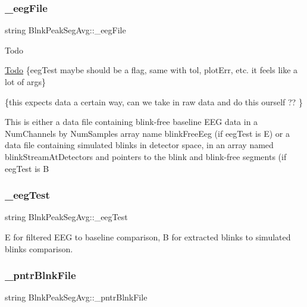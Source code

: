 \subsubsection{\texorpdfstring{\+\_\+eeg\+File}{\_eegFile}}
{\footnotesize\ttfamily string Blnk\+Peak\+Seg\+Avg\+::\+\_\+eeg\+File\hspace{0.3cm}{\ttfamily [private]}}

\begin{DoxyRefDesc}{Todo}
\item[\hyperlink{todo__todo000002}{Todo}]\{eeg\+Test maybe should be a flag, same with tol, plot\+Err, etc. it feels like a lot of args\} 

\{this expects data a certain way, can we take in raw data and do this ourself ?? \} \end{DoxyRefDesc}
This is either a data file containing blink-\/free baseline E\+EG data in a Num\+Channels by Num\+Samples array name blink\+Free\+Eeg (if eeg\+Test is \textquotesingle{}E\textquotesingle{}) or a data file containing simulated blinks in detector space, in an array named blink\+Stream\+At\+Detectors and pointers to the blink and blink-\/free segments (if eeg\+Test is \textquotesingle{}B\textquotesingle{} \mbox{\label{classBlnkPeakSegAvg_a6c00c8592e31ae1b455d280f4cc38f14}} 
\subsubsection{\texorpdfstring{\+\_\+eeg\+Test}{\_eegTest}}
{\footnotesize\ttfamily string Blnk\+Peak\+Seg\+Avg\+::\+\_\+eeg\+Test\hspace{0.3cm}{\ttfamily [private]}}

\textquotesingle{}E\textquotesingle{} for filtered E\+EG to baseline comparison, \textquotesingle{}B\textquotesingle{} for extracted blinks to simulated blinks comparison. \mbox{\label{classBlnkPeakSegAvg_a0dc6865b43997d95a59da56e3be254c8}} 
\subsubsection{\texorpdfstring{\+\_\+pntr\+Blnk\+File}{\_pntrBlnkFile}}
{\footnotesize\ttfamily string Blnk\+Peak\+Seg\+Avg\+::\+\_\+pntr\+Blnk\+File\hspace{0.3cm}{\ttfamily [private]}}



